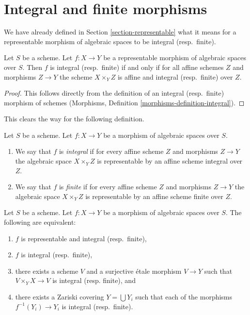 \section{Integral and finite morphisms}
\label{section-integral}

\noindent
We have already defined in Section \ref{section-representable}
what it means for a representable morphism of algebraic spaces
to be integral (resp.\ finite).

\begin{lemma}
\label{lemma-integral-representable}
Let $S$ be a scheme. Let $f : X \to Y$ be a representable
morphism of algebraic spaces over $S$. Then
$f$ is integral (resp.\ finite) if and only if for all affine schemes $Z$
and morphisms $Z \to Y$ the scheme $X \times_Y Z$ is affine and
integral (resp.\ finite) over $Z$.
\end{lemma}

\begin{proof}
This follows directly from the definition of an integral (resp.\ finite)
morphism of schemes
(Morphisms, Definition \ref{morphisms-definition-integral}).
\end{proof}

\noindent
This clears the way for the following definition.

\begin{definition}
\label{definition-integral}
Let $S$ be a scheme.
Let $f : X \to Y$ be a morphism of algebraic spaces over $S$.
\begin{enumerate}
\item We say that $f$ is {\it integral} if for every affine scheme $Z$
and morphisms $Z \to Y$ the algebraic space $X \times_Y Z$ is
representable by an affine scheme integral over $Z$.
\item We say that $f$ is {\it finite} if for every affine scheme $Z$
and morphisms $Z \to Y$ the algebraic space $X \times_Y Z$ is
representable by an affine scheme finite over $Z$.
\end{enumerate}
\end{definition}

\begin{lemma}
\label{lemma-integral-local}
Let $S$ be a scheme.
Let $f : X \to Y$ be a morphism of algebraic spaces over $S$.
The following are equivalent:
\begin{enumerate}
\item $f$ is representable and integral (resp.\ finite),
\item $f$ is integral (resp.\ finite),
\item there exists a scheme $V$ and a surjective \'etale morphism
$V \to Y$ such that $V \times_Y X \to V$ is integral (resp. finite), and
\item there exists a Zariski covering $Y = \bigcup Y_i$ such that
each of the morphisms $f^{-1}(Y_i) \to Y_i$ is integral (resp.\ finite).
\end{enumerate}
\end{lemma}


